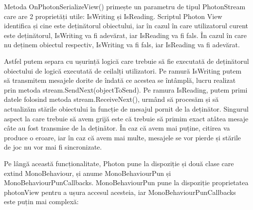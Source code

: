 \documentclass[12pt, a4paper]{article}
\begin{document}
	Metoda OnPhotonSerializeView() primește un parametru de tipul PhotonStream care are 2 proprietăți utile: IsWriting și IsReading. Scriptul Photon View identifica și cine este deținătorul obiectului, iar în cazul în care utilizatorul curent este deținătorul, IsWriting va fi adevărat, iar IsReading va fi fals. În cazul în care nu deținem obiectul respectiv, IsWriting va fi fals, iar IsReading va fi adevărat.
	\newline
	
	Astfel putem separa cu ușurință logică care trebuie să fie executată de deținătorul obiectului de logică executată de ceilalți utilizatori. Pe ramură IsWriting putem să transmitem mesajele dorite de îndată ce acestea se întâmplă, lucru realizat prin metoda stream.SendNext(objectToSend). Pe ramura IsReading, putem primi datele folosind metoda stream.ReceiveNext(), urmând să procesăm și să actualizăm stările obiectului în funcție de mesajul pornit de la deținător. Singurul aspect la care trebuie să avem grijă este că trebuie să primim exact atâtea mesaje câte au fost transmise de la deținător. În caz că avem mai puține, citirea va produce o eroare, iar în caz că avem mai multe, mesajele se vor pierde și stările de joc nu vor mai fi sincronizate.
	\newline
	
	
	Pe lângă această funcționalitate, Photon pune la dispoziție și două clase care extind MonoBehaviour, și anume MonoBehaviourPun și MonoBehaviourPunCallbacks. MonoBehaviourPun pune la dispoziție proprietatea photonView pentru a ușura accesul acesteia, iar MonoBehaviourPunCallbacks este puțin mai complexă:
	
\end{document}
